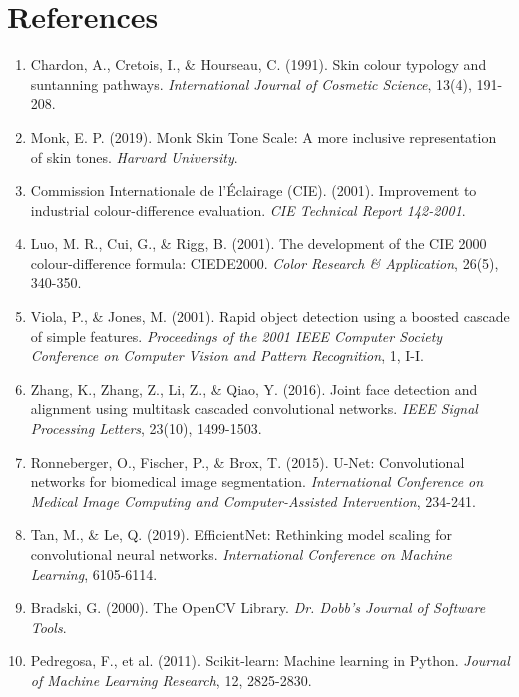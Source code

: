 \section*{References}

\begin{enumerate}

\item Chardon, A., Cretois, I., \& Hourseau, C. (1991). Skin colour typology and suntanning pathways. \textit{International Journal of Cosmetic Science}, 13(4), 191-208.

\item Monk, E. P. (2019). Monk Skin Tone Scale: A more inclusive representation of skin tones. \textit{Harvard University}.

\item Commission Internationale de l'Éclairage (CIE). (2001). Improvement to industrial colour-difference evaluation. \textit{CIE Technical Report 142-2001}.

\item Luo, M. R., Cui, G., \& Rigg, B. (2001). The development of the CIE 2000 colour-difference formula: CIEDE2000. \textit{Color Research \& Application}, 26(5), 340-350.

\item Viola, P., \& Jones, M. (2001). Rapid object detection using a boosted cascade of simple features. \textit{Proceedings of the 2001 IEEE Computer Society Conference on Computer Vision and Pattern Recognition}, 1, I-I.

\item Zhang, K., Zhang, Z., Li, Z., \& Qiao, Y. (2016). Joint face detection and alignment using multitask cascaded convolutional networks. \textit{IEEE Signal Processing Letters}, 23(10), 1499-1503.

\item Ronneberger, O., Fischer, P., \& Brox, T. (2015). U-Net: Convolutional networks for biomedical image segmentation. \textit{International Conference on Medical Image Computing and Computer-Assisted Intervention}, 234-241.

\item Tan, M., \& Le, Q. (2019). EfficientNet: Rethinking model scaling for convolutional neural networks. \textit{International Conference on Machine Learning}, 6105-6114.

\item Bradski, G. (2000). The OpenCV Library. \textit{Dr. Dobb's Journal of Software Tools}.

\item Pedregosa, F., et al. (2011). Scikit-learn: Machine learning in Python. \textit{Journal of Machine Learning Research}, 12, 2825-2830.


\end{enumerate}
